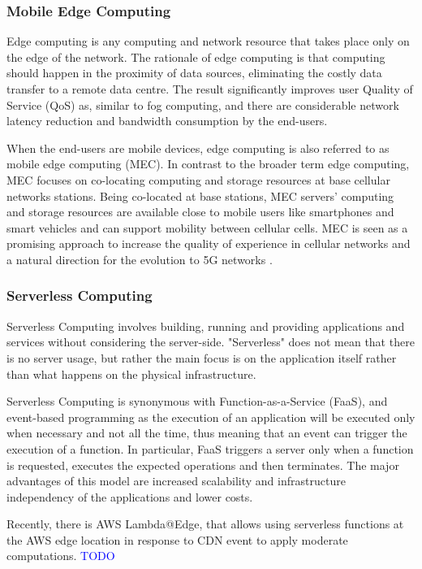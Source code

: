 \documentclass{ieeeaccess}
\begin{document}
\subsubsection{Mobile Edge Computing}

Edge computing \cite{edge-computing-vision-challenges} is any computing and network resource that takes place only on the edge of the network. The rationale of edge computing is that computing should happen in the proximity of data sources, eliminating the costly data transfer to a remote data centre. The result significantly improves user Quality of Service (QoS) as, similar to fog computing, and there are considerable network latency reduction and bandwidth consumption by the end-users.

When the end-users are mobile devices, edge computing is also referred to as mobile edge computing (MEC). In contrast to the broader term edge computing, MEC focuses on co-locating computing and storage resources at base cellular networks stations. Being co-located at base stations, MEC servers' computing and storage resources are available close to mobile users like smartphones and smart vehicles and can support mobility between cellular cells. MEC is seen as a promising approach to increase the quality of experience in cellular networks and a natural direction for the evolution to 5G networks \cite{nfv-5g}.

\subsubsection{Serverless Computing}

Serverless Computing \cite{serverless-berkeley} involves building, running and providing applications and services without considering the server-side. "Serverless" does not mean that there is no server usage, but rather the main focus is on the application itself rather than what happens on the physical infrastructure.

Serverless Computing is synonymous with Function-as-a-Service (FaaS), and event-based programming as the execution of an application will be executed only when necessary and not all the time, thus meaning that an event can trigger the execution of a function. In particular, FaaS triggers a server only when a function is requested, executes the expected operations and then terminates. The major advantages of this model are increased scalability and infrastructure independency of the applications and lower costs.

Recently, there is AWS Lambda@Edge, that allows using serverless functions at the AWS edge location in response to CDN event to apply moderate computations. \textcolor{blue}{TODO}
\end{document}
